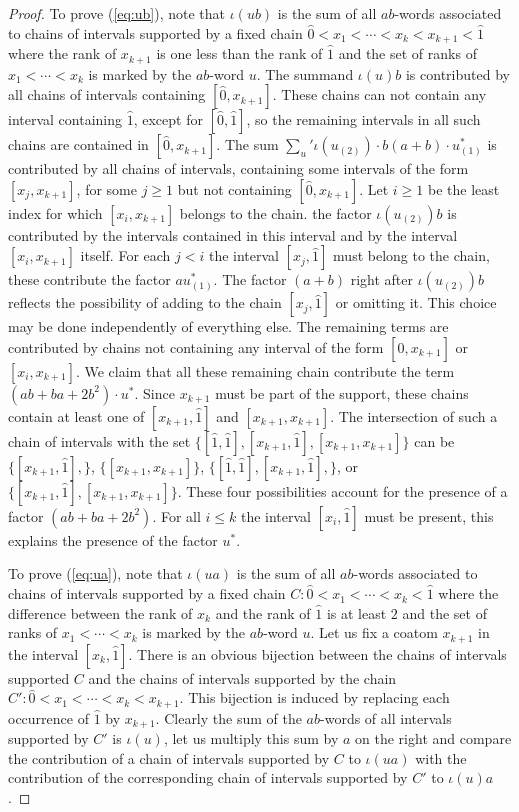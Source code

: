 \documentclass[reqno,12pt]{amsart}
\numberwithin{equation}{section}
\newcommand{\0}{\widehat{0}}
\newcommand{\1}{\widehat{1}}
\newcommand{\2}{\widehat{2}}
\newcommand{\iab}{\iota}
\begin{document}
\begin{proof}
To prove (\ref{eq:ub}), note that $\iab(ub)$ is the sum of all
$ab$-words associated to chains of intervals supported by a fixed chain
$\0<x_1<\cdots <x_k<x_{k+1}<\1$ where the rank of $x_{k+1}$ is one less than
the rank of $\1$ and the set of ranks of $x_1<\cdots <x_k$ is marked by
the $ab$-word $u$. The summand $\iab(u)b$ is contributed by all chains
of intervals containing $[\0,x_{k+1}]$. These chains can not contain any
interval containing $\1$, except for $[\0,\1]$, so the remaining
intervals in all such chains are contained in $[\0,x_{k+1}]$.
The sum $\sum_{u}'\iab(u_{(2)})\cdot b(a+b)\cdot u_{(1)}^*$ is
contributed by all chains of intervals, containing some intervals of the
form $[x_j,x_{k+1}]$, for some $j\geq 1$ but not containing
$[\0,x_{k+1}]$. Let $i\geq 1$ be the least index 
for which $[x_i,x_{k+1}]$ belongs to the chain. the factor
$\iab(u_{(2)})b$ is contributed by the intervals contained in this
interval and by the interval $[x_i,x_{k+1}]$ itself. For each $j<i$ the
interval $[x_j,\1]$ must belong to the chain, these contribute the
factor $au_{(1)}^*$. The factor $(a+b)$ right after $\iab(u_{(2)})b$
reflects the possibility of adding to the chain $[x_j,\1]$ or omitting
it. This choice may be done independently of everything else. 
The remaining terms are contributed by chains not
containing any interval of the form $[\0,x_{k+1}]$ or $[x_i,x_{k+1}]$.
We claim that all these remaining chain contribute the term
$(ab+ba+2b^2)\cdot u^*$. Since $x_{k+1}$ must be part of the support,
these chains contain at least one of $[x_{k+1},\1]$ and $[x_{k+1},x_{k+1}]$.
The intersection of such a chain of intervals with the set $\{[\1,\1],
[x_{k+1},\1], [x_{k+1},x_{k+1}] \}$ can be $\{[x_{k+1},\1],\}$,
$\{[x_{k+1},x_{k+1}]\}$, $\{[\1,\1], [x_{k+1},\1],\}$, or 
$\{[x_{k+1},\1], [x_{k+1},x_{k+1}] \}$. These four possibilities account
for the presence of a factor $(ab+ba+2b^2)$. For all $i\leq k$ the
interval $[x_i,\1]$ must be present, this explains the presence of the
factor $u^*$.  

To prove (\ref{eq:ua}), note that $\iab(ua)$ is the sum of all
$ab$-words associated to chains of intervals supported by a fixed chain
$C:\0<x_1<\cdots <x_k<\1$ where the difference between the rank of $x_{k}$
and the rank of $\1$ is at least $2$ and the set of ranks of $x_1<\cdots
<x_k$ is marked by the $ab$-word $u$. Let us fix a coatom $x_{k+1}$ in
the interval $[x_k,\1]$. There is an obvious bijection between the
chains of intervals supported $C$ and the chains of intervals
supported by the chain $C':\0<x_1<\cdots <x_k<x_{k+1}$. This bijection
is induced by replacing each occurrence of $\1$ by $x_{k+1}$. Clearly
the sum of the $ab$-words of all intervals supported by $C'$ is
$\iab(u)$, let us multiply this sum by $a$ on the right and compare the
contribution of a chain of intervals supported by $C$ to $\iab(ua)$ with
the contribution of the corresponding chain of intervals supported by
$C'$ to $\iab(u)a$. 


\end{proof}
\end{document}
